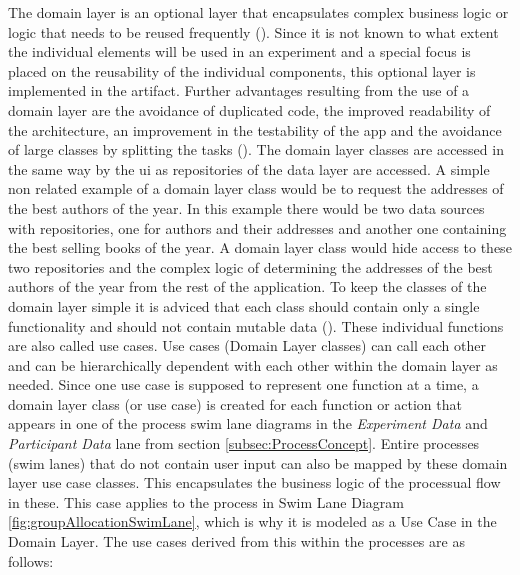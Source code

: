 The domain layer is an optional layer that encapsulates complex business logic or logic that needs to be reused frequently (\cite{Google.2023}). Since it is not known to what extent the individual elements will be used in an experiment and a special focus is placed on the reusability of the individual components, this optional layer is implemented in the artifact. Further advantages resulting from the use of a domain layer are the avoidance of duplicated code, the improved readability of the architecture, an improvement in the testability of the app and the avoidance of large classes by splitting the tasks (\cite{Google.2023}). The domain layer classes are accessed in the same way by the \ac{ui} as repositories of the data layer are accessed. A simple non related example of a domain layer class would be to request the addresses of the best authors of the year. In this example there would be two data sources with repositories, one for authors and their addresses and another one containing the best selling books of the year. A domain layer class would hide access to these two repositories and the complex logic of determining the addresses of the best authors of the year from the rest of the application. To keep the classes of the domain layer simple it is adviced that each class should contain only a single functionality and should not contain mutable data (\cite{Google.2023}). These individual functions are also called use cases. Use cases (Domain Layer classes) can call each other and can be hierarchically dependent with each other within the domain layer as needed. Since one use case is supposed to represent one function at a time, a domain layer class (or use case) is created for each function or action that appears in one of the process swim lane diagrams in the \textit{Experiment Data} and \textit{Participant Data} lane from section \ref{subsec:ProcessConcept}. Entire processes (swim lanes) that do not contain user input can also be mapped by these domain layer use case classes. This encapsulates the business logic of the processual flow in these. This case applies to the process in Swim Lane Diagram \ref{fig:groupAllocationSwimLane}, which is why it is modeled as a Use Case in the Domain Layer. The use cases derived from this within the processes are as follows:

